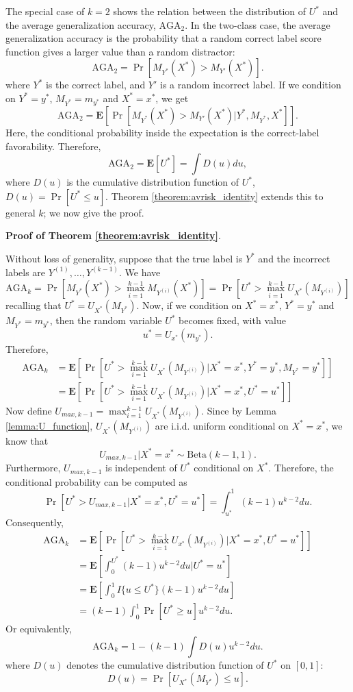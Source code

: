 \documentclass[twoside,11pt]{article}
\newcommand{\E}{\textbf{E}}
\begin{document}
The special case of $k=2$ shows the relation between the distribution
of $U^*$ and the average generalization accuracy, $\text{AGA}_2$. In
the two-class case, the average generalization accuracy is the
probability that a random correct label score function gives a larger
value than a random distractor:
\[
\text{AGA}_2 = \Pr[M_{Y^*}(X^*) > M_{Y'}(X^*)].
\]
where $Y^*$ is the correct label, and $Y'$ is a random incorrect
label.  If we condition on $Y^* = y^*$, $M_{Y^*} = m_{y^*}$ and $X^* =
x^*$, we get
\[
\text{AGA}_2 = \E[\Pr[M_{Y^*}(X^*) > M_{Y'}(X^*)|Y^*, M_{Y^*}, X^*]].
\]
Here, the conditional probability inside the expectation is the
correct-label favorability.  Therefore,
\[
\text{AGA}_2 = \E[U^*] = \int {D}(u) du,
\]
where ${D}(u)$ is the cumulative distribution function of $U^*$,
${D}(u) = \Pr[U^* \leq u]$.  Theorem \ref{theorem:avrisk_identity}
extends this to general $k$; we now give the proof.\newline


\noindent\textbf{Proof of Theorem \ref{theorem:avrisk_identity}}.

Without loss of generality, suppose that the true label is $Y^*$ and
the incorrect labels are $Y^{(1)},\hdots, Y^{(k-1)}$.  We have
\[
\text{AGA}_k = \Pr[M_{Y^*}(X^*) > \max_{i=1}^{k-1} M_{Y^{(i)}}(X^*)]
= \Pr[U^* > \max_{i=1}^{k-1} U_{X^*}(M_{Y^{(i)}})]
\]
recalling that $U^* = U_{X^*}(M_{Y^*})$.  Now, if we condition on $X^*
= x^*$, $Y^* = y^*$ and $M_{Y^*} = m_{y^*}$, then the random variable
$U^*$ becomes fixed, with value
\[
u^* = U_{x^*}(m_{y^*}).
\]
Therefore,
\begin{align*}
\text{AGA}_k &=\E[\Pr[U^* > \max_{i=1}^{k-1} U_{X^*}(M_{Y^{(i)}})|X^* = x^*, Y^* = y^*, M_{Y^*} = y^*]]
\\&= \E[\Pr[U^* > \max_{i=1}^{k-1} U_{X^*}(M_{Y^{(i)}})|X^* = x^*, U^* = u^*]]
\end{align*}
Now define $U_{max, k-1} = \max_{i=1}^{k-1} U_{X^*}(M_{Y^{(i)}})$. 
Since by Lemma \ref{lemma:U_function},
$U_{X^*}(M_{Y^{(i)}})$ are i.i.d. uniform conditional on $X^* = x^*$, we know that
\begin{equation}\label{eq:umax_beta}
U_{max, k-1}|X^* = x^* \sim \text{Beta}(k-1, 1). 
\end{equation}
Furthermore, $U_{max, k-1}$ is independent of $U^*$ conditional on
$X^*$.  Therefore, the conditional probability can be computed as
\[
\Pr[U^* > U_{max, k-1}|X^* = x^*, U^* = u^*] = \int_{u^*}^1 (k-1) u^{k-2} du.
\]
Consequently,
\begin{align*}
\text{AGA}_k &= \E[\Pr[U^* > \max_{i=1}^{k-1} U_{x^*}(M_{Y^{(i)}})|X^* = x^*, U^* = u^*]]
\\&= \E[\int_0^{U^*} (k-1) u^{k-2} du|U^* = u^*]
\\&= \E[\int_0^1 I\{u \leq U^*\} (k-1) u^{k-2} du ]
\\&= (k-1) \int_0^1 \Pr[U^* \geq u] u^{k-2} du.
\end{align*}
Or equivalently,
\[
\text{AGA}_k = 1 - (k-1) \int {D}(u) u^{k-2} du.
\]
where ${D}(u)$ denotes the cumulative distribution function of
$U^*$ on $[0,1]$:
\begin{equation}\label{eq:Kbar}
{D}(u) = \Pr[U_{X^*}(M_{Y^*}) \leq u].
\end{equation}
\end{document}

